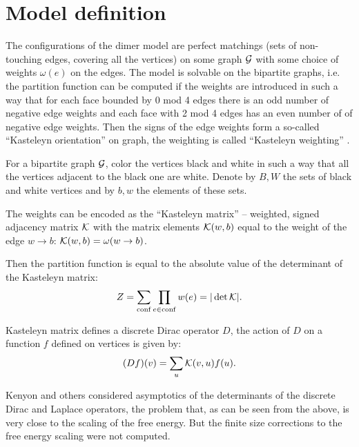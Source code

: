 \documentclass{article}
\begin{document}
\section{Model definition}
\label{sec:model-definition}
The configurations of the dimer model are perfect matchings (sets of non-touching edges, covering
all the vertices) on some graph ${\cal G}$ with some choice of weights $\omega(e)$ on the edges. The
model is solvable on the bipartite graphs, i.e. the partition function can be computed if the
weights are introduced in such a way that for each face bounded by 0 mod 4 edges there is an odd
number of negative edge weights and each face with 2 mod 4 edges has an even number of of negative
edge weights. Then the signs of the edge weights form a so-called ``Kasteleyn orientation'' on graph,
the weighting is called ``Kasteleyn weighting'' \cite{kenyon2001dominos,kenyon2009lectures}.

For a bipartite graph ${\cal G}$, color the vertices black and white in such a way that all the
vertices adjacent to the black one are white. Denote by $B, W$ the sets of black and white
vertices and by $b,w$ the elements of these sets. 

The weights can be encoded as the ``Kasteleyn matrix'' -- weighted, signed adjacency matrix ${\cal K}$ with
the matrix elements ${\cal K}(w,b)$ equal to the weight of the edge $w\to b$: ${\cal K}(w,b)=\omega(w\to b)$.

Then the partition function is equal to the absolute value of the determinant of the Kasteleyn
matrix\cite{P.W-1961,doi:10.1080/14786436108243366}: 
\begin{equation}
  \label{eq:15}
  Z=\sum_{\mathrm{conf}}\prod_{e\in \mathrm{conf}}w(e)=|\det {\cal K}|.
\end{equation}

Kasteleyn matrix defines a discrete Dirac operator $D$, the action of $D$ on a function $f$ defined
on vertices is given by:
\begin{equation}
  \label{eq:16}
  (Df)(v)=\sum_{u}{\cal K}(v,u) f(u).
\end{equation}

Kenyon \cite{kenyon2002laplacian,kenyon2000asymptotic} and others \cite{sridhar2015asymptotic}
considered asymptotics of the determinants of the discrete Dirac and Laplace operators, the problem
that, as can be seen from the above, is very close to the scaling of the free energy. But the finite
size corrections to the free energy scaling were not computed. 
  
\end{document}
